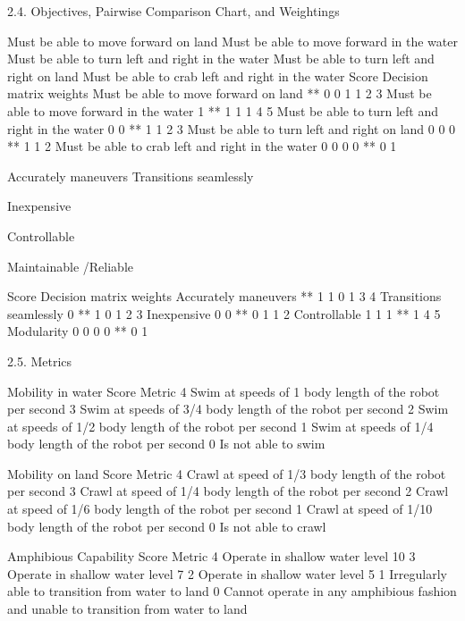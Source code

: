         2.4. Objectives, Pairwise Comparison Chart, and Weightings 



Must be able to move forward on land
Must be able to move forward in the water
Must be able to turn left and right in the water
Must be able to turn left and right on land 
Must be able to crab left and right in the water
Score
Decision matrix weights
Must be able to move forward on land
**
0
0
1
1
2
3
Must be able to move forward in the water
1
**
1
1
1
4
5
Must be able to turn left and right in the water
0
0
**
1
1
2
3
Must be able to turn left and right on land 
0
0
0
**
1
1
2
Must be able to crab left and right in the water
0
0
0
0
**
0
1



Accurately maneuvers
Transitions seamlessly

Inexpensive

Controllable

Maintainable /Reliable

Score
Decision matrix weights
Accurately maneuvers
**
1
1
0
1
3
4
Transitions seamlessly
0
**
1
0
1
2
3
Inexpensive
0
0
**
0
1
1
2
Controllable
1
1
1
**
1
4
5
Modularity
0
0
0
0
**
0
1

        2.5. Metrics 


Mobility in water
Score
Metric
4
Swim at speeds of 1 body length of the robot per second
3
Swim at speeds of 3/4 body length of the robot per second
2
Swim at speeds of 1/2 body length of the robot per second
1
Swim at speeds of 1/4 body length of the robot per second
0
Is not able to swim 


Mobility on land
Score
Metric
4
Crawl at speed of 1/3 body length of the robot per second
3
Crawl at speed of 1/4 body length of the robot per second
2
Crawl at speed of 1/6 body length of the robot per second
1
Crawl at speed of 1/10 body length of the robot per second
0
Is not able to crawl











Amphibious Capability
Score
Metric
4
Operate in shallow water level 10%
3
Operate in shallow water level 7%
2
Operate in shallow water level 5%
1
Irregularly able to transition from water to land 
0
Cannot operate in any amphibious fashion and unable to transition from water to land 


